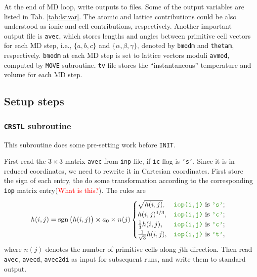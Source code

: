 At the end of MD loop, write outputs to files.
Some of the output variables are listed in Tab. \ref{tab:lstvar}.
The atomic and lattice contributions could be also understood as
ionic and cell contributions, respectively. Another
important output file is \texttt{avec}, which stores lengths and angles 
between primitive cell vectors for each MD step, i.e.,
$\{a, b, c\}$ and $\{\alpha, \beta, \gamma\}$,
denoted by \texttt{bmodm} and
\texttt{thetam}, respectively. 
\texttt{bmodm} at each MD step
is set to lattice vectors moduli \texttt{avmod}, computed by \texttt{MOVE} subroutine.
\texttt{tv} file stores the ``instantaneous'' temperature and volume
for each MD step.

\subsection{Setup steps}

\subsubsection{\texttt{CRSTL} subroutine}

This subroutine does some pre-setting work before \texttt{INIT}.

First read the $3 \times 3$ matrix \texttt{avec} from \texttt{inp} file,
if \texttt{ic} flag is \texttt{'s'}.
Since it is in reduced coordinates, we need to rewrite it in Cartesian
coordinates. First store the sign of each entry, the do some transformation according to
the corresponding \texttt{iop} matrix entry(\textcolor{red}{What is this?}). The 
rules are
\begin{equation}\label{eq:crstltrans}
	h(i, j) = \sign \big( h(i, j) \big) \times a_0 \times n(j)
	\begin{cases}
		\sqrt{h(i, j)},                 & \text{\texttt{iop(i,j)} is \texttt{'s'};} \\
		h(i, j)^{1/3},                  & \text{\texttt{iop(i,j)} is \texttt{'c'};} \\
		\frac{ 1 }{ 3 } h(i, j),        & \text{\texttt{iop(i,j)} is \texttt{'c'};} \\
		\frac{ 1 }{ \sqrt{3} } h(i, j), & \text{\texttt{iop(i,j)} is \texttt{'t'},} 
	\end{cases}
\end{equation}
where $n(j)$ denotes the number of primitive cells along $j$th direction.
Then read \texttt{avec}, \texttt{avecd}, \texttt{avec2di} as 
input for subsequent runs, and write them to standard output.


